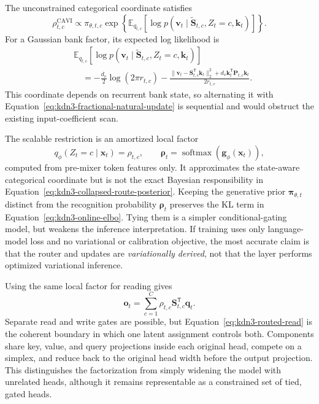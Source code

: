 \documentclass[11pt]{article}
\newcommand{\ve}[1]{\boldsymbol{#1}}
\newcommand{\tr}{\mathsf{T}}
\newcommand{\E}{\mathbb{E}}
\newcommand{\softmax}{\operatorname{softmax}}
\begin{document}
The unconstrained categorical coordinate satisfies
\begin{equation}
  \rho_{t,c}^{\mathrm{CAVI}}
  \propto
  \pi_{\theta,t,c}
  \exp\!\left\{
    \E_{q_{t,c}}
    [\log p(\ve{v}_t\mid
      \widetilde{\ve{S}}_{t,c},Z_t=c,\ve{k}_t)]
  \right\}.
  \label{eq:kdn3-cavi-route}
\end{equation}
For a Gaussian bank factor, its expected log likelihood is
\begin{equation}
\begin{aligned}
  &\E_{q_{t,c}}
   [\log p(\ve{v}_t\mid
      \widetilde{\ve{S}}_{t,c},Z_t=c,\ve{k}_t)]
  \\
  &\quad=
  -\frac{d_v}{2}\log(2\pi r_{t,c})
  -\frac{
    \|\ve{v}_t-\ve{S}_{t,c}^{\tr}\ve{k}_t\|_2^2
    +d_v\ve{k}_t^{\tr}\ve{P}_{t,c}\ve{k}_t
  }{2r_{t,c}}.
\end{aligned}
  \label{eq:kdn3-expected-log-likelihood}
\end{equation}
This coordinate depends on recurrent bank state, so alternating it with
Equation~\eqref{eq:kdn3-fractional-natural-update} is sequential and would obstruct the existing
input-coefficient scan.

The scalable restriction is an amortized local factor
\begin{equation}
  q_{\phi}(Z_t=c\mid\ve{x}_t)=\rho_{t,c},
  \qquad
  \ve{\rho}_t=\softmax(\ve{g}_{\phi}(\ve{x}_t)),
  \label{eq:kdn3-amortized-router}
\end{equation}
computed from pre-mixer token features only.  It approximates the state-aware categorical
coordinate but is not the exact Bayesian responsibility in
Equation~\eqref{eq:kdn3-collapsed-route-posterior}.  Keeping the generative prior
$\ve{\pi}_{\theta,t}$ distinct from the recognition probability $\ve{\rho}_t$ preserves the KL
term in Equation~\eqref{eq:kdn3-online-elbo}.  Tying them is a simpler conditional-gating model,
but weakens the inference interpretation.  If training uses only language-model loss and no
variational or calibration objective, the most accurate claim is that the router and updates are
\emph{variationally derived}, not that the layer performs optimized variational inference.

Using the same local factor for reading gives
\begin{equation}
  \ve{o}_t
  =\sum_{c=1}^{C}
    \rho_{t,c}\ve{S}_{t,c}^{\tr}\ve{q}_t.
  \label{eq:kdn3-routed-read}
\end{equation}
Separate read and write gates are possible, but Equation~\eqref{eq:kdn3-routed-read} is the
coherent boundary in which one latent assignment controls both.  Components share key, value, and
query projections inside each original head, compete on a simplex, and reduce back to the
original head width before the output projection.  This distinguishes the factorization from
simply widening the model with unrelated heads, although it remains representable as a constrained
set of tied, gated heads.
\end{document}
